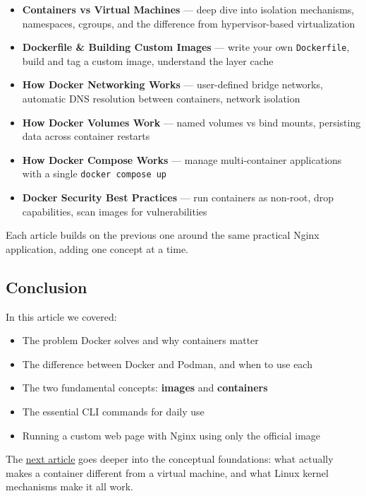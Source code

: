 \documentclass[11pt,american,a4paper,openany]{book}
\providecommand{\tightlist}{%
  \setlength{\itemsep}{2pt}\setlength{\parskip}{0pt}}
\begin{document}
\begin{itemize}
\tightlist
\item
  \textbf{Containers vs Virtual Machines} --- deep dive into isolation
  mechanisms, namespaces, cgroups, and the difference from
  hypervisor-based virtualization
\item
  \textbf{Dockerfile \& Building Custom Images} --- write your own
  \texttt{Dockerfile}, build and tag a custom image, understand the
  layer cache
\item
  \textbf{How Docker Networking Works} --- user-defined bridge networks,
  automatic DNS resolution between containers, network isolation
\item
  \textbf{How Docker Volumes Work} --- named volumes vs bind mounts,
  persisting data across container restarts
\item
  \textbf{How Docker Compose Works} --- manage multi-container
  applications with a single \texttt{docker\ compose\ up}
\item
  \textbf{Docker Security Best Practices} --- run containers as
  non-root, drop capabilities, scan images for vulnerabilities
\end{itemize}

Each article builds on the previous one around the same practical Nginx
application, adding one concept at a time.

\subsection{Conclusion}\label{conclusion}

In this article we covered:

\begin{itemize}
\tightlist
\item
  The problem Docker solves and why containers matter
\item
  The difference between Docker and Podman, and when to use each
\item
  The two fundamental concepts: \textbf{images} and \textbf{containers}
\item
  The essential CLI commands for daily use
\item
  Running a custom web page with Nginx using only the official image
\end{itemize}

The
\href{/Users/sasadangelo/github.com/sasadangelo/code4projects/containers-vs-virtual-machines-2025/}{next
article} goes deeper into the conceptual foundations: what actually
makes a container different from a virtual machine, and what Linux
kernel mechanisms make it all work.
\end{document}
